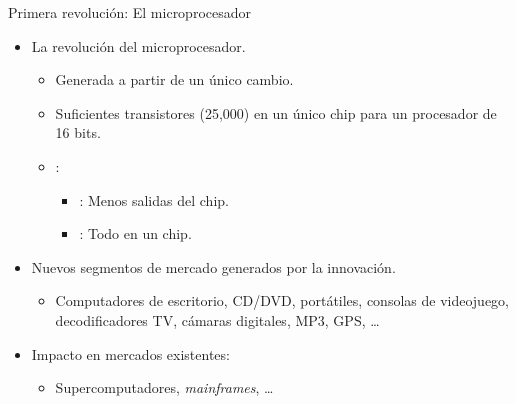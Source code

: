 \begin{frame}[t]{Primera revolución: El microprocesador}
\begin{itemize}
  \item La revolución del microprocesador.
    \begin{itemize}
      \item Generada a partir de un único cambio.
      \item Suficientes transistores (25,000) en un único chip para un procesador de 16 bits.
      \item {}:
        \begin{itemize}
          \item {}: Menos salidas del chip.
          \item {}: Todo en un chip.
        \end{itemize}
    \end{itemize}
  \item Nuevos segmentos de mercado generados por la innovación.
    \begin{itemize}
      \item Computadores de escritorio, CD/DVD, portátiles, consolas de videojuego,
            decodificadores TV, cámaras digitales, MP3, GPS, \ldots
    \end{itemize}
  \item Impacto en mercados existentes:
    \begin{itemize}
      \item Supercomputadores, \emph{mainframes}, \ldots
    \end{itemize}
\end{itemize}
\end{frame}

